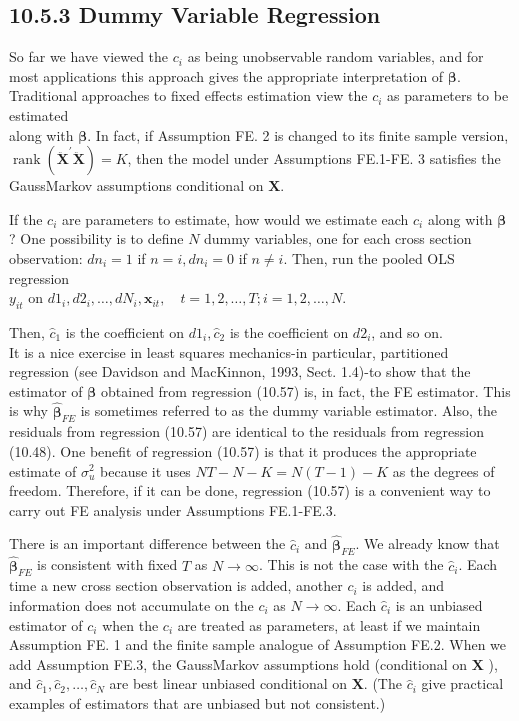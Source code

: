 \documentclass[10pt]{article}
\begin{document}
\subsection*{10.5.3 Dummy Variable Regression}
So far we have viewed the $c_{i}$ as being unobservable random variables, and for most applications this approach gives the appropriate interpretation of $\boldsymbol{\beta}$. Traditional approaches to fixed effects estimation view the $c_{i}$ as parameters to be estimated\\
along with $\boldsymbol{\beta}$. In fact, if Assumption FE. 2 is changed to its finite sample version, $\operatorname{rank}\left(\ddot{\mathbf{X}}^{\prime} \ddot{\mathbf{X}}\right)=K$, then the model under Assumptions FE.1-FE. 3 satisfies the GaussMarkov assumptions conditional on $\mathbf{X}$.

If the $c_{i}$ are parameters to estimate, how would we estimate each $c_{i}$ along with $\boldsymbol{\beta}$ ? One possibility is to define $N$ dummy variables, one for each cross section observation: $d n_{i}=1$ if $n=i, d n_{i}=0$ if $n \neq i$. Then, run the pooled OLS regression\\
$y_{i t}$ on $d 1_{i}, d 2_{i}, \ldots, d N_{i}, \mathbf{x}_{i t}, \quad t=1,2, \ldots, T ; i=1,2, \ldots, N$.

Then, $\hat{c}_{1}$ is the coefficient on $d 1_{i}, \hat{c}_{2}$ is the coefficient on $d 2_{i}$, and so on.\\
It is a nice exercise in least squares mechanics-in particular, partitioned regression (see Davidson and MacKinnon, 1993, Sect. 1.4)-to show that the estimator of $\boldsymbol{\beta}$ obtained from regression (10.57) is, in fact, the FE estimator. This is why $\hat{\boldsymbol{\beta}}_{F E}$ is sometimes referred to as the dummy variable estimator. Also, the residuals from regression (10.57) are identical to the residuals from regression (10.48). One benefit of regression (10.57) is that it produces the appropriate estimate of $\sigma_{u}^{2}$ because it uses $N T-N-K=N(T-1)-K$ as the degrees of freedom. Therefore, if it can be done, regression (10.57) is a convenient way to carry out FE analysis under Assumptions FE.1-FE.3.

There is an important difference between the $\hat{c}_{i}$ and $\hat{\boldsymbol{\beta}}_{F E}$. We already know that $\hat{\boldsymbol{\beta}}_{F E}$ is consistent with fixed $T$ as $N \rightarrow \infty$. This is not the case with the $\hat{c}_{i}$. Each time a new cross section observation is added, another $c_{i}$ is added, and information does not accumulate on the $c_{i}$ as $N \rightarrow \infty$. Each $\hat{c}_{i}$ is an unbiased estimator of $c_{i}$ when the $c_{i}$ are treated as parameters, at least if we maintain Assumption FE. 1 and the finite sample analogue of Assumption FE.2. When we add Assumption FE.3, the GaussMarkov assumptions hold (conditional on $\mathbf{X}$ ), and $\hat{c}_{1}, \hat{c}_{2}, \ldots, \hat{c}_{N}$ are best linear unbiased conditional on $\mathbf{X}$. (The $\hat{c}_{i}$ give practical examples of estimators that are unbiased but not consistent.)
\end{document}
